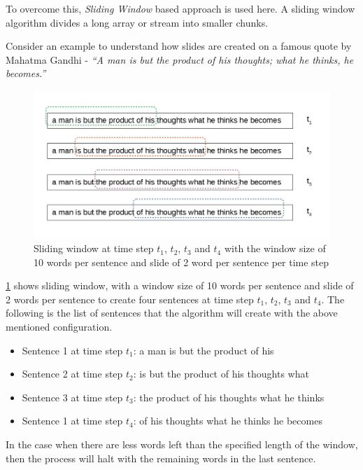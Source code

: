 To overcome this, \textit{Sliding Window} based approach is used here. A sliding window algorithm divides a long array or stream into smaller chunks.  

Consider an example to understand how slides are created on a famous quote by Mahatma Gandhi - \textit{``A man is but the product of his thoughts; what he thinks, he becomes.''}

\begin{figure}[!ht]
    \centering
    \includegraphics[width=12cm]{pics/SlidingWindow.jpg}
    \captionsetup{justification=centering,margin=2cm}
    \caption{Sliding window at time step $t_{1}$, $t_{2}$, $t_{3}$ and $t_{4}$ with the window size of 10 words per sentence and slide of 2 word per sentence per time step}
    \label{fig:sldingwindow}
\end{figure}

\ref{fig:sldingwindow} shows sliding window, with a window size of 10 words per sentence and slide of 2 words per sentence to create four sentences at time step $t_{1}$, $t_{2}$, $t_{3}$ and $t_{4}$. The following is the list of sentences that the algorithm will create with the above mentioned configuration.

\begin{itemize}
    \item Sentence 1 at time step $t_{1}$: a man is but the product of his
    \item Sentence 2 at time step $t_{2}$: is but the product of his thoughts what
    \item Sentence 3 at time step $t_{3}$: the product of his thoughts what he thinks
    \item Sentence 1 at time step $t_{4}$: of his thoughts what he thinks he becomes
\end{itemize}

In the case when there are less words left than the specified length of the window, then the process will halt with the remaining words in the last sentence.

